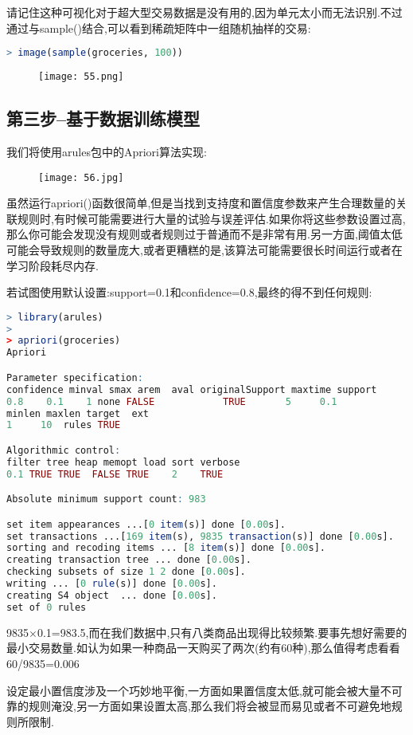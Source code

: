 \documentclass[11pt,a4paper,oneside]{book}
\begin{document}
请记住这种可视化对于超大型交易数据是没有用的,因为单元太小而无法识别.不过通过与sample()结合,可以看到稀疏矩阵中一组随机抽样的交易:
\begin{lstlisting}[language=r]
> image(sample(groceries, 100))
\end{lstlisting}
\begin{figure}[H]
	\centering
	\texttt{[image: 55.png]}
\end{figure}

\subsection{第三步--基于数据训练模型}
我们将使用arules包中的Apriori算法实现:
\begin{figure}[H]
	\centering
	\texttt{[image: 56.jpg]}
\end{figure}
虽然运行apriori()函数很简单,但是当找到支持度和置信度参数来产生合理数量的关联规则时,有时候可能需要进行大量的试验与误差评估.如果你将这些参数设置过高,那么你可能会发现没有规则或者规则过于普通而不是非常有用.另一方面,阈值太低可能会导致规则的数量庞大,或者更糟糕的是,该算法可能需要很长时间运行或者在学习阶段耗尽内存.

若试图使用默认设置:support=0.1和confidence=0.8,最终的得不到任何规则:
\begin{lstlisting}[language=r]
> library(arules)
> 
> apriori(groceries)
Apriori

Parameter specification:
confidence minval smax arem  aval originalSupport maxtime support
0.8    0.1    1 none FALSE            TRUE       5     0.1
minlen maxlen target  ext
1     10  rules TRUE

Algorithmic control:
filter tree heap memopt load sort verbose
0.1 TRUE TRUE  FALSE TRUE    2    TRUE

Absolute minimum support count: 983 

set item appearances ...[0 item(s)] done [0.00s].
set transactions ...[169 item(s), 9835 transaction(s)] done [0.00s].
sorting and recoding items ... [8 item(s)] done [0.00s].
creating transaction tree ... done [0.00s].
checking subsets of size 1 2 done [0.00s].
writing ... [0 rule(s)] done [0.00s].
creating S4 object  ... done [0.00s].
set of 0 rules 
\end{lstlisting}
9835$ \times $0.1=983.5,而在我们数据中,只有八类商品出现得比较频繁.要事先想好需要的最小交易数量.如认为如果一种商品一天购买了两次(约有60种),那么值得考虑看看60/9835=0.006

设定最小置信度涉及一个巧妙地平衡,一方面如果置信度太低,就可能会被大量不可靠的规则淹没,另一方面如果设置太高,那么我们将会被显而易见或者不可避免地规则所限制.
\end{document}
